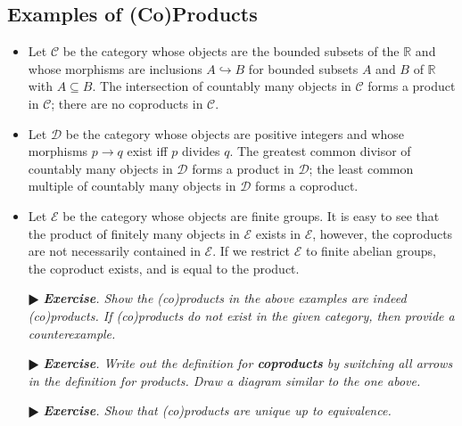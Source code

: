 \documentclass[11pt]{amsart}
\theoremstyle{definition}
\renewcommand\:{\colon}
\newcommand{\calC}{\mathcal{C}}
\newcommand{\calD}{\mathcal{D}}
\newcommand{\R}{\mathds{R}}
\newcommand{\1}{\mathds{1}}
\newcommand{\exc}[1]{\vspace{-2.5pt}\begin{itemize}[leftmargin=15pt]\item[$\RHD$] \textit{\textbf{Exercise}. #1}\end{itemize}}
\begin{document}
\begin{center}
\end{center}

\subsection*{Examples of (Co)Products}
\vspace{-5pt}\begin{itemize}[leftmargin=*]\setlength\itemsep{0em}
	\item Let $\calC$ be the category whose objects are the bounded subsets of the $\R$ and whose morphisms are inclusions $A \hookrightarrow B$ for bounded subsets $A$ and $B$ of $\R$ with $A \subseteq B$. The intersection of countably many objects in $\calC$ forms a product in $\calC$; there are no coproducts in $\calC$.
	\item Let $\calD$ be the category whose objects are positive integers and whose morphisms $p \to q$ exist iff $p$ divides $q$. The greatest common divisor of countably many objects in $\calD$ forms a product in $\calD$; the least common multiple of countably many objects in $\calD$ forms a coproduct.
	\item Let $\mathcal{E}$ be the category whose objects are finite groups. It is easy to see that the product of finitely many objects in $\mathcal{E}$ exists in $\mathcal{E}$, however, the coproducts are not necessarily contained in $\mathcal{E}$. If we restrict $\mathcal{E}$ to finite abelian groups, the coproduct exists, and is equal to the product.
\end{itemize}
\vskip5pt

\exc{Show the \textnormal{(}co\textnormal{)}products in the above examples are indeed \textnormal{(}co\textnormal{)}products. If \textnormal{(}co\textnormal{)}products do not exist in the given category, then provide a counterexample.}
\exc{Write out the definition for \textbf{\textit{coproducts}} by switching all arrows in the definition for products. Draw a diagram similar to the one above.}
\exc{Show that \textnormal{(}co\textnormal{)}products are unique up to equivalence.}
\vskip20pt
\end{document}
